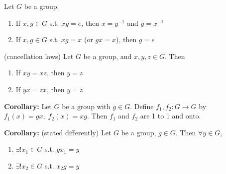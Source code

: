 \prop Let $G$ be a group. 
\begin{enumerate}
    \item If $x, y \in G$ s.t. $xy = e$, then $x=y^{-1}$ and $y=x^{-1}$
    \item If $x, g \in G$ s.t. $xg = x$ (or $gx = x$), then $g = e$
\end{enumerate}

\prop (cancellation laws) Let $G$ be a group, and $x, y, z \in G$. Then 
\begin{enumerate}
    \item If $xy = xz$, then $y = z$
    \item If $yx = zx$, then $y = z$
\end{enumerate}

\bigskip 

\noindent 
\textbf{Corollary:} Let $G$ be a group with $g \in G$. Define $f_1, f_2: G \rightarrow G$ by $f_1(x) = gx,\; f_2(x) = xg$. Then $f_1$ and $f_2$ are 1 to 1 and onto.

\bigskip 

\noindent 
\textbf{Corollary:} (stated differently) Let $G$ be a group, $g \in G$. Then $\forall y \in G$,
\begin{enumerate}
    \item $\exists! x_1 \in G$ s.t. $gx_1 = y$
    \item $\exists! x_2 \in G$ s.t. $x_2g = y$
\end{enumerate} 